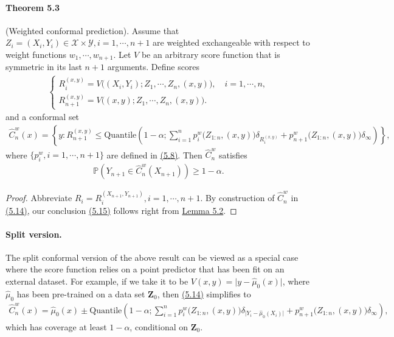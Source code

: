 \documentclass{article}
\numberwithin{equation}{section}
\begin{document}
\paragraph{Theorem 5.3\label{Theorem 5.3}} (Weighted conformal prediction). Assume that $Z_i=(X_i,Y_i)\in\mathcal{X}\times\mathcal{Y},i=1,\cdots,n+1$ are weighted exchangeable with respect to weight functions $w_1,\cdots,w_{n+1}.$ Let $V$ be an arbitrary score function that is symmetric in its last $n + 1$ arguments. Define scores
\begin{align*}
	\begin{cases}
	R_i^{(x,y)} = V\bigl((X_i,Y_i);Z_1,\cdots,Z_n,(x,y)\bigr),\quad i=1,\cdots,n,\\
	R_{n+1}^{(x,y)} = V\bigl((x,y);Z_1,\cdots,Z_n,(x,y)\bigr).
	\end{cases}\tag{5.13}\label{5.13}
\end{align*}
and a conformal set
\begin{align*}
	\widehat{C}_n^w(x) = \left\{y:R_{n+1}^{(x,y)}\leq\mathrm{Quantile}\left(1-\alpha;\sum_{i=1}^np_i^w\bigl(Z_{1:n},(x,y)\bigr)\delta_{R_i^{(x,y)}} + p_{n+1}^w\bigl(Z_{1:n},(x,y)\bigr)\delta_\infty\right) \right\},\tag{5.14}\label{5.14}
\end{align*}
where $\{p_i^w,i=1,\cdots,n+1\}$ are defined in \hyperref[5.8]{(5.8)}. Then $\widehat{C}_n^w$ satisfies
\begin{align*}
	\mathbb{P}\left(Y_{n+1}\in\widehat{C}_n^w(X_{n+1})\right)\geq 1-\alpha.\tag{5.15}\label{5.15}
\end{align*}
\begin{proof}
Abbreviate $R_i=R_i^{(X_{n+1},Y_{n+1})},i=1,\cdots,n+1.$ By construction of $\widehat{C}_n^w$ in \hyperref[5.14]{(5.14)}, our conclusion \hyperref[5.15]{(5.15)} follows right from \hyperref[Lemma 5.2]{Lemma 5.2}.
\end{proof}

\paragraph{Split version.} The split conformal version of the above result can be viewed as a special case where the score function relies on a point predictor that has been fit on an external dataset. For example, if we take it to be $V(x,y) = \vert y - \widehat{\mu}_0(x)\vert$, where $\widehat{\mu}_0$ has been pre-trained on a data set $\mathbf{Z}_0$, then \hyperref[5.14]{(5.14)} simplifies to
\begin{align*}
\widehat{C}_n^w(x) = \widehat{\mu}_0(x)\pm \mathrm{Quantile}\left(1-\alpha;\sum_{i=1}^np_i^w\bigl(Z_{1:n},(x,y)\bigr)\delta_{\vert Y_i-\widehat{\mu}_0(X_i)\vert} + p_{n+1}^w\bigl(Z_{1:n},(x,y)\bigr)\delta_\infty\right),\tag{5.16}
\end{align*}
which has coverage at least $1-\alpha$, conditional on $\mathbf{Z}_0.$
\end{document}
